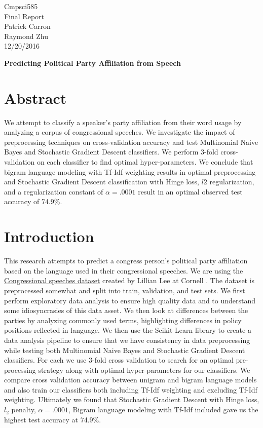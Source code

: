 \documentclass[a4paper, 12pt]{article}
\begin{document}
\noindent
Cmpsci585\\
Final Report\\
Patrick Carron \\
Raymond Zhu\\
12/20/2016 \\
\begin{center}

\textbf{Predicting Political Party Affiliation from Speech}
\end{center}

\section{Abstract}
We attempt to classify a speaker's party affiliation from their word usage by analyzing a corpus of congressional speeches.  We investigate the impact of preprocessing techniques on cross-validation accuracy and test Multinomial Naive Bayes and Stochastic Gradient Descent classifiers. We perform 3-fold cross-validation on each classifier to find optimal hyper-parameters. We conclude that bigram language modeling with Tf-Idf weighting results in optimal preprocessing and Stochastic Gradient Descent classification with Hinge loss, $l2$ regularization, and a regularization constant  of $\alpha=.0001$ result in an optimal observed test accuracy of 74.9\%.
	
	\section{Introduction}
	
	This research attempts to predict a congress person's political party affiliation based on the language used in their congressional speeches. We are using the \href{http://www.cs.cornell.edu/home/llee/data/convote.html}{Congressional speeches dataset} created by Lillian Lee at Cornell \cite{thomas2006get}. The dataset is preprocessed somewhat and split into train, validation, and test sets.  We first perform exploratory data analysis to ensure high quality data and to understand some idiosyncrasies of this data asset. We then look at differences between the parties by analyzing commonly used terms, highlighting differences in policy positions reflected in language. We then use the \cite{pedregosa2011scikit} Scikit Learn library to create a data analysis pipeline to ensure that we have consistency in data preprocessing while testing both Multinomial Naive Bayes and Stochastic Gradient Descent classifiers.  For each we use 3-fold cross validation to search for an optimal pre-processing strategy along with optimal hyper-parameters for our classifiers.  We compare cross validation accuracy between unigram and bigram language models and also train our classifiers both including Tf-Idf weighting and excluding Tf-Idf weighting. Ultimately we found that Stochastic Gradient Descent with Hinge loss, $l_2$ penalty, $\alpha=.0001$,  Bigram language modeling with Tf-Idf included gave us the highest test accuracy at 74.9\%.
	
\end{document}
